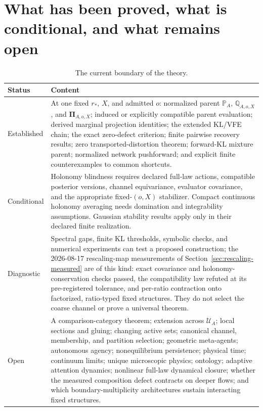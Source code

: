 \documentclass[11pt,letterpaper]{article}
\newcommand{\Prob}{\mathbb P}
\newcommand{\Rec}{\mathbb Q}
\newcommand{\Post}{\boldsymbol\Pi}
\begin{document}
\section{What has been proved, what is conditional, and what remains open}
\label{sec:status}

\begin{table}[ht]
\centering
\small
\begin{tabularx}{\textwidth}{>{\raggedright\arraybackslash}p{}X}
\toprule
\textbf{Status} & \textbf{Content} \\
\midrule
Established &
At one fixed \(r_*\), \(X\), and admitted \(o\): normalized parent \(\Prob_A\), \(\Rec_{A,o,X}\), and \(\Post_{A,o,X}\); induced or explicitly compatible parent evaluation; derived marginal projection identities; the extended KL/VFE chain; the exact zero-defect criterion; finite pairwise recovery results; zero transported-distortion theorem; forward-KL mixture parent; normalized network pushforward; and explicit finite counterexamples to common shortcuts. \\
\addlinespace
Conditional &
Holonomy blindness requires declared full-law actions, compatible posterior versions, channel equivariance, evaluator covariance, and the appropriate fixed-\((o,X)\) stabilizer. Compact continuous holonomy averaging needs domination and integrability assumptions. Gaussian stability results apply only in their declared finite realization. \\
\addlinespace
Diagnostic &
Spectral gaps, finite KL thresholds, symbolic checks, and numerical experiments can test a proposed construction; the 2026-08-17 rescaling-map measurements of Section~\ref{sec:rescaling-measured} are of this kind: exact covariance and holonomy-conservation checks passed, the compatibility law refuted at its pre-registered tolerance, and per-ratio contraction onto factorized, ratio-typed fixed structures. They do not select the coarse channel or prove a universal theorem. \\
\addlinespace
Open &
A comparison-category theorem; extension across \(\mathcal U_A\); local sections and gluing; changing active sets; canonical channel, membership, and partition selection; geometric meta-agents; autonomous agency; nonequilibrium persistence; physical time; continuum limits; unique microscopic physics; ontology; adaptive attention dynamics; nonlinear full-law dynamical closure; whether the measured composition defect contracts on deeper flows; and which boundary-multiplicity architectures sustain interacting fixed structures. \\
\bottomrule
\end{tabularx}
\caption{The current boundary of the theory.}
\label{tab:status}
\end{table}
\end{document}
